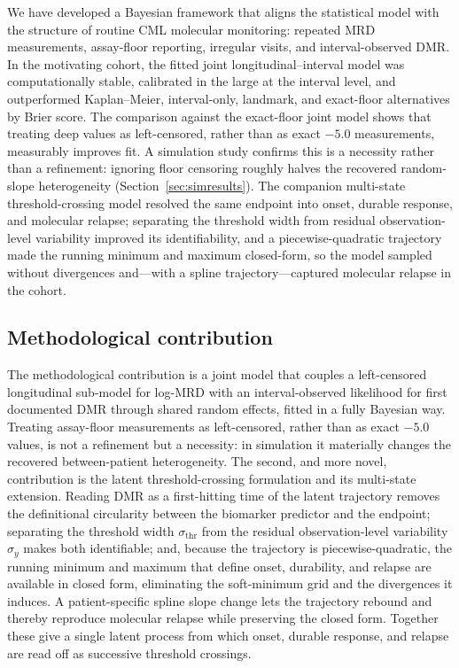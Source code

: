 \documentclass[11pt]{article}
\begin{document}
We have developed a Bayesian framework that aligns the statistical model
with the structure of routine CML molecular monitoring: repeated MRD
measurements, assay-floor reporting, irregular visits, and
interval-observed DMR. In the motivating cohort, the fitted joint
longitudinal--interval model was computationally stable, calibrated in the
large at the interval level, and outperformed Kaplan--Meier,
interval-only, landmark, and exact-floor alternatives by Brier score. The
comparison against the exact-floor joint model shows that treating deep
values as left-censored, rather than as exact $-5.0$ measurements,
measurably improves fit. A simulation study confirms this is a necessity
rather than a refinement: ignoring floor censoring roughly halves the
recovered random-slope heterogeneity (Section~\ref{sec:simresults}). The
companion multi-state threshold-crossing model resolved the same endpoint into
onset, durable response, and molecular relapse; separating the threshold width
from residual observation-level variability improved its identifiability, and a piecewise-quadratic
trajectory made the running minimum and maximum closed-form, so the model
sampled without divergences and---with a spline trajectory---captured molecular
relapse in the cohort.

\subsection{Methodological contribution}

The methodological contribution is a joint model that couples a
left-censored longitudinal sub-model for log-MRD with an interval-observed
likelihood for first documented DMR through shared random effects, fitted in
a fully Bayesian way. Treating assay-floor measurements as left-censored,
rather than as exact $-5.0$ values, is not a refinement but a necessity: in
simulation it materially changes the recovered between-patient
heterogeneity. The second, and more novel, contribution is the latent threshold-crossing
formulation and its multi-state extension. Reading DMR as a first-hitting time
of the latent trajectory removes the definitional circularity between the
biomarker predictor and the endpoint; separating the threshold width
$\sigma_{\mathrm{thr}}$ from the residual observation-level variability $\sigma_y$ makes both
identifiable; and, because the trajectory is piecewise-quadratic, the running
minimum and maximum that define onset, durability, and relapse are available in
closed form, eliminating the soft-minimum grid and the divergences it induces.
A patient-specific spline slope change lets the trajectory rebound and thereby
reproduce molecular relapse while preserving the closed form. Together these
give a single latent process from which onset, durable response, and relapse
are read off as successive threshold crossings.
\end{document}
